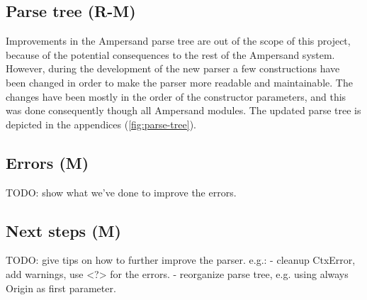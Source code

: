 \subsection{Parse tree (R-M)}
\label{subsec:design-parse-tree}
Improvements in the Ampersand parse tree are out of the scope of this project, because of the potential consequences to the rest of the Ampersand system.
However, during the development of the new parser a few constructions have been changed in order to make the parser more readable and maintainable.
The changes have been mostly in the order of the constructor parameters, and this was done consequently though all Ampersand modules.
The updated parse tree is depicted in the appendices (\autoref{fig:parse-tree}).

\subsection{Errors (M)}
\label{subsec:design-errors}
TODO: show what we've done to improve the errors.

\subsection{Next steps (M)}
\label{subsec:design-next-steps}
TODO: give tips on how to further improve the parser. e.g.:
  - cleanup CtxError, add warnings, use <?> for the errors.
  - reorganize parse tree, e.g. using always Origin as first parameter.